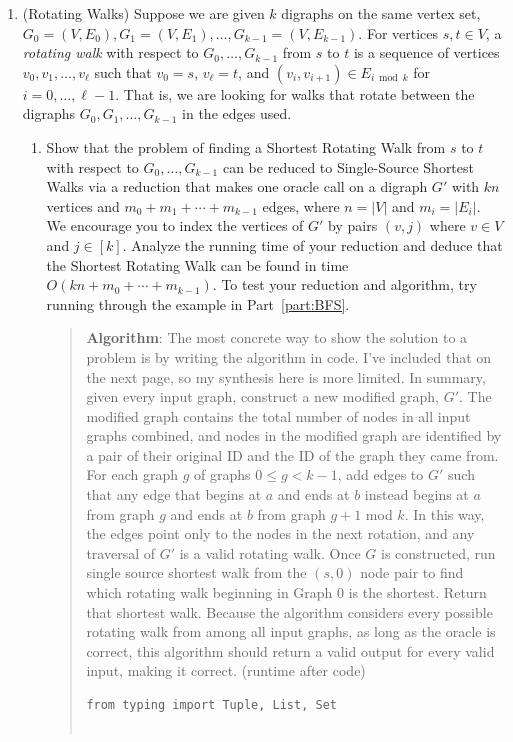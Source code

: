 \documentclass[11pt]{article}
\begin{document}
\begin{enumerate}
\begin{quote}
        
    \end{quote}

    \item  (Rotating Walks)  
    Suppose we are given $k$ digraphs on the same vertex set, $G_0=(V,E_0), G_1=(V,E_1), \ldots, G_{k-1}=(V,E_{k-1})$.  For vertices $s,t\in V$, a {\em rotating walk} with respect to $G_0,\ldots,G_{k-1}$ from $s$ to $t$ is a sequence of vertices $v_0,v_1,\ldots,v_{\ell}$ such that $v_0=s$, $v_\ell=t$, and $(v_i,v_{i+1})\in E_{i \bmod k}$ for $i=0,\ldots,\ell-1$.  That is, we are looking for walks that rotate between the digraphs $G_0,G_1,\ldots,G_{k-1}$ in the edges used.
    \begin{enumerate}
        \item Show that the problem of finding a Shortest Rotating Walk from $s$ to $t$ with respect to $G_0,\ldots,G_{k-1}$ 
        can be reduced to Single-Source Shortest Walks via a reduction that makes one oracle call on 
        a digraph $G'$ with $kn$ vertices and $m_0+m_1+\cdots+m_{k-1}$ edges, where $n=|V|$ and $m_i=|E_i|$.
        We encourage you to index the vertices of $G'$ by pairs $(v,j)$ where $v\in V$ and $j\in [k]$. 
        Analyze the running time of your reduction and deduce that the Shortest Rotating Walk can be found in time $O(kn+m_0+\cdots+m_{k-1})$.
        \label{part:ReduceToOrdinary}  To test your reduction and algorithm, try running through the example in Part~\ref{part:BFS}.
        \begin{quote}
            \color{purple}
            \textbf{Algorithm}: \newline 
            The most concrete way to show the solution to a problem is by writing the algorithm in code. I've included that on the next page, so my synthesis here is more limited. In summary, given every input graph, construct a new modified graph, $G'$. The modified graph contains the total number of nodes in all input graphs combined, and nodes in the modified graph are identified by a pair of their original ID and the ID of the graph they came from. For each graph $g$ of graphs $0 \leq g < k - 1$, add edges to $G'$ such that any edge that begins at $a$ and ends at $b$ instead begins at $a$ from graph $g$ and ends at $b$ from graph $g + 1$ mod $k$. In this way, the edges point only to the nodes in the next rotation, and any traversal of $G'$ is a valid rotating walk. Once $G$ is constructed, run single source shortest walk from the $(s, 0)$ node pair to find which rotating walk beginning in Graph 0 is the shortest. Return that shortest walk. Because the algorithm considers every possible rotating walk from among all input graphs, as long as the oracle is correct, this algorithm should return a valid output for every valid input, making it correct. (runtime after code)
            \newpage 
\begin{verbatim}
from typing import Tuple, List, Set


\end{verbatim}
\end{quote}
\end{enumerate}
\end{enumerate}
\end{document}
